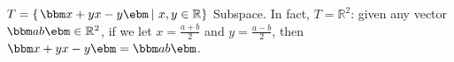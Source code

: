 {$T = \left\{\left. \bbm x+y\\x-y \ebm \, \right| \, x , y \in \mathbb{R}\right\}$}
{Subspace. In fact, $T=\mathbb{R}^2$: given any vector $\bbm a\\b\ebm \in \mathbb{R}^2$, if we let $x=\frac{a+b}{2}$ and $y=\frac{a-b}{2}$, then $\bbm x+y\\x-y\ebm = \bbm a\\b\ebm$.}